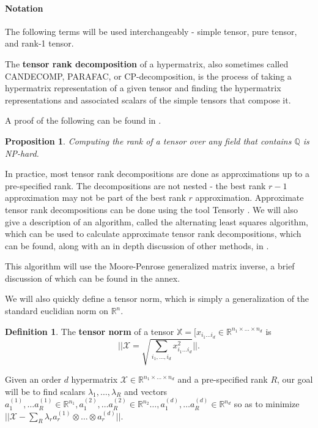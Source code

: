 \documentclass{report}
\newtheorem{prop}{Proposition}
\theoremstyle{definition}
\newtheorem{defin}{Definition}
\theoremstyle{remark}
\begin{document}
\paragraph{Notation} The following terms will be used interchangeably - simple tensor, pure tensor, and rank-1 tensor.

The \textbf{tensor rank decomposition} of a hypermatrix, also sometimes called CANDECOMP, PARAFAC, or CP-decomposition, is the process of taking a hypermatrix representation of a given tensor and finding the hypermatrix representations and associated scalars of the simple tensors that compose it. 

A proof of the following can be found in \cite{HilLim}.
\begin{prop}
        Computing the rank of a tensor over any field that contains $\mathbb{Q}$ is NP-hard.
\end{prop}

In practice, most tensor rank decompositions are done as approximations up to a pre-specified rank. The decompositions are not nested - the best rank $r-1$ approximation may not be part of the best rank $r$ approximation. Approximate tensor rank decompositions can be done using the tool Tensorly \cite{Tensorly}. We will also give a description of an algorithm, called the alternating least squares algorithm, which can be used to calculate approximate tensor rank decompositions, which can be found, along with an in depth discussion of other methods, in \cite{Kolda}.

This algorithm will use the Moore-Penrose generalized matrix inverse, a brief discussion of which can be found in the annex. 

We will also quickly define a tensor norm, which is simply a generalization of the standard euclidian norm on $\mathbb{R}^n$. 

\begin{defin}
        The \textbf{tensor norm} of a tensor $\mathbb{X} = [x_{i_1\dots i_d} \in \mathbb{R}^{n_1 \times \dots \times n_d}$ is 
        \begin{equation*}
            || \mathcal{X} = \sqrt{ \sum_{i_1, \dots,i_d} x_{i_1 \dots i_d}^2 } ||.
        \end{equation*}
\end{defin}

Given an order $d$ hypermatrix $\mathcal{X} \in \mathbb{R}^{n_1 \times \dots \times n_d}$ and a pre-specified rank $R$, our goal will be to find scalars $\lambda_1, \dots, \lambda_R$ and vectors $a_1^{(1)}, \dots a_R^{(1)} \in \mathbb{R}^{n_1},a_1^{(2)}, \dots a_R^{(2)} \in \mathbb{R}^{n_2} \dots, a_1^{(d)}, \dots a_R^{(d)} \in \mathbb{R}^{n_d} $ so as to minimize$|| \mathcal{X} - \sum_R \lambda_r a^{(1)}_r \otimes \dots \otimes a_r^{(d)} ||$.
\end{document}
